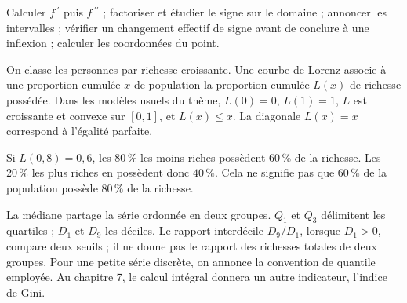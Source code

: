 \begin{savoirfaire}
Calculer $f\,\!^{\prime}$ puis $f\,\!^{\prime\prime}$ ; factoriser et étudier le signe sur le domaine ; annoncer les intervalles ; vérifier un changement effectif de signe avant de conclure à une inflexion ; calculer les coordonnées du point.
\end{savoirfaire}
On classe les personnes par richesse croissante. Une courbe de Lorenz associe à une proportion cumulée $x$ de population la proportion cumulée $L(x)$ de richesse possédée.
Dans les modèles usuels du thème, $L(0)=0$, $L(1)=1$, $L$ est croissante et convexe sur $[0,1]$, et $L(x)\leq x$.
La diagonale $L(x)=x$ correspond à l'égalité parfaite.
\begin{exemple}
Si $L(0{,}8)=0{,}6$, les $80\,\%$ les moins riches possèdent $60\,\%$ de la richesse. Les $20\,\%$ les plus riches en possèdent donc $40\,\%$. Cela ne signifie pas que $60\,\%$ de la population possède $80\,\%$ de la richesse.
\end{exemple}
La médiane partage la série ordonnée en deux groupes. $Q_1$ et $Q_3$ délimitent les quartiles ; $D_1$ et $D_9$ les déciles.
Le rapport interdécile $D_9/D_1$, lorsque $D_1>0$, compare deux seuils ; il ne donne pas le rapport des richesses totales de deux groupes.
Pour une petite série discrète, on annonce la convention de quantile employée. Au chapitre 7, le calcul intégral donnera un autre indicateur, l'indice de Gini.


